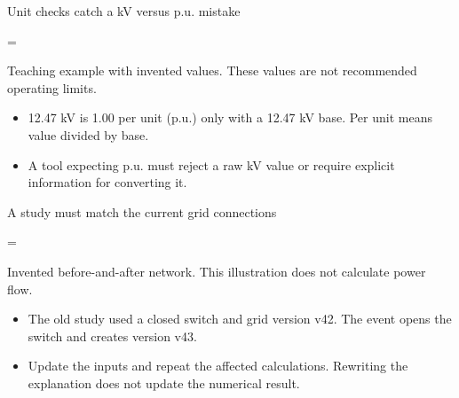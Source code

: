 \begin{frame}[t]{Unit checks catch a kV versus p.u. mistake}
\relax
\begingroup\begin{minipage}[c][4cm][c]{\linewidth}\centering{}=\hbox{\resizebox{.96\linewidth}{!}{}}\ifdim\dimexpr\ht0+\dp0\relax>4cm\resizebox{!}{4cm}{\box0}\else\box0\fi\par\end{minipage}
{\fontsize{7}{8.3}\selectfont\color{Slate} Teaching example with invented values. These values are not recommended operating limits.\par}
\endgroup\smallskip
{
\small\begin{itemize}
\setlength{\itemsep}{.25em}
\item 12.47 kV is 1.00 per unit (p.u.) only with a 12.47 kV base. Per unit means value divided by base.
\item A tool expecting p.u. must reject a raw kV value or require explicit information for converting it.
\end{itemize}\par}
\vfill
{}
\end{frame}

\begin{frame}[t]{A study must match the current grid connections}
\relax
\begingroup\begin{minipage}[c][4cm][c]{\linewidth}\centering{}=\hbox{\resizebox{.96\linewidth}{!}{}}\ifdim\dimexpr\ht0+\dp0\relax>4cm\resizebox{!}{4cm}{\box0}\else\box0\fi\par\end{minipage}
{\fontsize{7}{8.3}\selectfont\color{Slate} Invented before-and-after network. This illustration does not calculate power flow.\par}
\endgroup\smallskip
{
\small\begin{itemize}
\setlength{\itemsep}{.25em}
\item The old study used a closed switch and grid version v42. The event opens the switch and creates version v43.
\item Update the inputs and repeat the affected calculations. Rewriting the explanation does not update the numerical result.
\end{itemize}\par}
\vfill
{}
\end{frame}

